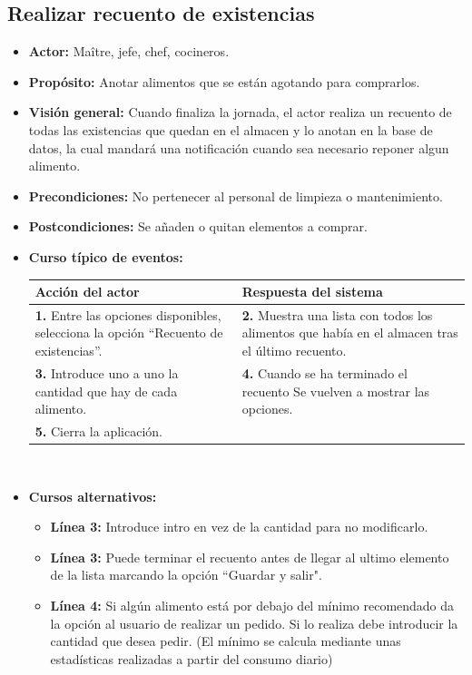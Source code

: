 \documentclass[spanish,a4paper,11pt, twoside]{report}	%
\begin{document}
	\subsection{Realizar recuento de existencias}
			\begin{itemize}
			\item \textbf{Actor:} Maître, jefe, chef, cocineros.
			\item \textbf{Propósito: } Anotar alimentos que se están agotando para comprarlos.
			\item \textbf{Visión general:} Cuando finaliza la jornada, el actor realiza un
				recuento de todas las existencias que quedan en el almacen y lo anotan en la
				base de datos, la cual mandará una notificación cuando sea necesario reponer
				algun alimento.
			\item \textbf{Precondiciones:} No pertenecer al personal de limpieza o mantenimiento.
			\item \textbf{Postcondiciones:} Se añaden o quitan elementos a comprar.
			\item \textbf{Curso típico de eventos:} 	\\
				\begin{tabular}{|p{6cm}||p{6cm}|}
				\hline
				\textbf{Acción del actor} & \textbf{Respuesta del sistema} \\ \hline
				\textbf{1.} Entre las opciones disponibles, selecciona la opción ``Recuento de existencias''. & 
				\textbf{2.} Muestra una lista con todos los alimentos que había en el almacen tras el último recuento. \\ \hline
				\textbf{3.} Introduce uno a uno la cantidad que hay de cada alimento. & 
				\textbf{4.} Cuando se ha terminado el recuento Se vuelven a mostrar las opciones. \\ \hline
				\textbf{5.}  Cierra la aplicación. &   \\ \hline
			\end{tabular}
			\\
			\item \textbf{Cursos alternativos:} 
			\begin{itemize}
				\item  \textbf{Línea 3:} Introduce intro en vez de la cantidad para no
					modificarlo.
				\item  \textbf{Línea 3:} Puede terminar el recuento antes de llegar al ultimo
					elemento de la lista marcando la opción “Guardar y salir".
				\item  \textbf{Línea 4:} Si algún alimento está por debajo del mínimo
					recomendado da la opción al usuario de realizar un pedido. Si lo realiza debe
					introducir la cantidad que desea pedir. (El mínimo se calcula mediante unas
					estadísticas realizadas a partir del consumo diario)
			\end {itemize}
		\end {itemize}
\end{document}
